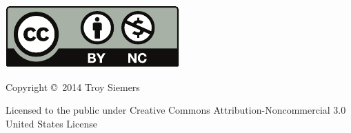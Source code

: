 \noindent\begin{minipage}{2in}
\includegraphics{text/by-nc} 
\end{minipage}
\begin{minipage}{3in}
\noindent Copyright \copyright\ 2014 Troy Siemers

Licensed to the public under Creative Commons Attribution-Noncommercial 3.0 United States License
\end{minipage}

